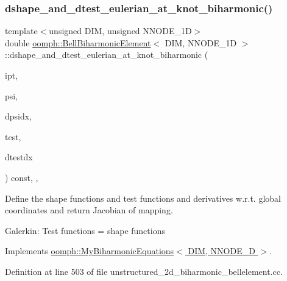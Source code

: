 \subsubsection{\texorpdfstring{dshape\+\_\+and\+\_\+dtest\+\_\+eulerian\+\_\+at\+\_\+knot\+\_\+biharmonic()}{dshape\_and\_dtest\_eulerian\_at\_knot\_biharmonic()}}
{\footnotesize\ttfamily template$<$unsigned D\+IM, unsigned N\+N\+O\+D\+E\+\_\+1D$>$ \\
double \hyperlink{classoomph_1_1BellBiharmonicElement}{oomph\+::\+Bell\+Biharmonic\+Element}$<$ D\+IM, N\+N\+O\+D\+E\+\_\+1D $>$\+::dshape\+\_\+and\+\_\+dtest\+\_\+eulerian\+\_\+at\+\_\+knot\+\_\+biharmonic (\begin{DoxyParamCaption}\item[{const unsigned \&}]{ipt,  }\item[{Shape \&}]{psi,  }\item[{D\+Shape \&}]{dpsidx,  }\item[{Shape \&}]{test,  }\item[{D\+Shape \&}]{dtestdx }\end{DoxyParamCaption}) const\hspace{0.3cm}{\ttfamily [inline]}, {\ttfamily [protected]}, {\ttfamily [virtual]}}

Define the shape functions and test functions and derivatives w.\+r.\+t. global coordinates and return Jacobian of mapping.

Galerkin\+: Test functions = shape functions 

Implements \hyperlink{classoomph_1_1MyBiharmonicEquations_a08e45fddb2c25119e6ba826cd6cafdbf}{oomph\+::\+My\+Biharmonic\+Equations$<$ D\+I\+M, N\+N\+O\+D\+E\+\_\+D $>$}.



Definition at line 503 of file unstructured\+\_\+2d\+\_\+biharmonic\+\_\+bellelement.\+cc.

\mbox{\label{classoomph_1_1BellBiharmonicElement_aaa8959c7456a75c15db4b42a70812304}} 
